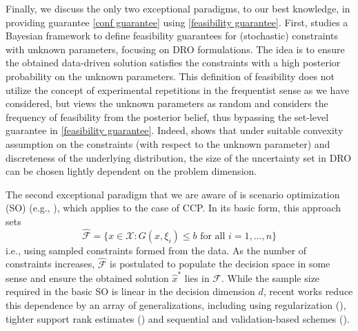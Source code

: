 \documentclass[mnsc,blindrev]{informs4} %
\begin{document}
Finally, we discuss the only two exceptional paradigms, to our best knowledge, in providing guarantee \eqref{conf guarantee} using \eqref{feasibility guarantee}. First, \cite{gupta2019near} studies a Bayesian framework to define feasibility guarantees for (stochastic) constraints with unknown parameters, focusing on DRO formulations. The idea is to ensure the obtained data-driven solution satisfies the constraints with a high posterior probability on the unknown parameters. This definition of feasibility does not utilize the concept of experimental repetitions in the frequentist sense as we have considered, but views the unknown parameters as random and considers the frequency of feasibility from the posterior belief, thus bypassing the set-level guarantee in \eqref{feasibility guarantee}. Indeed, \cite{gupta2019near} shows that under suitable convexity assumption on the constraints (with respect to the unknown parameter) and discreteness of the underlying distribution, the size of the uncertainty set in DRO can be chosen lightly dependent on the problem dimension.

The second exceptional paradigm that we are aware of is scenario optimization (SO) (e.g., \cite{calafiore2005uncertain,campi2008exact}), which applies to the case of CCP. In its basic form, this approach sets $$\hat{\mathcal F}=\{x\in\mathcal X:
   G(x,\xi_i)\leq b\text{\ \ for all\ \ }i=1,\ldots,n\}$$
i.e., using sampled constraints formed from the data. As the number of constraints increases, $\hat{\mathcal F}$ is postulated to populate the decision space in some sense and ensure the obtained solution $\hat x^*$ lies in $\mathcal F$. While the sample size required in the basic SO is linear in the decision dimension $d$, recent works reduce this dependence by an array of generalizations, including using regularization (\cite{campi2013random}), tighter support rank estimates (\cite{schildbach2013randomized,campi2018wait}) and sequential and validation-based schemes (\cite{care2014fast,calafiore2017repetitive}).
\end{document}
